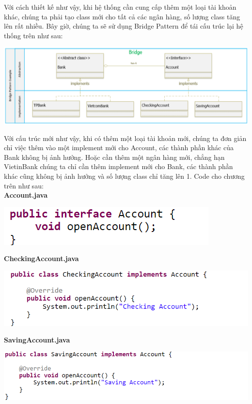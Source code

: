 Với cách thiết kế như vậy, khi hệ thống cần cung cấp thêm một loại tài khoản khác, chúng ta phải tạo class mới cho tất cả các ngân hàng, số lượng class tăng lên rất nhiều. Bây giờ, chúng ta sẽ sử dụng Bridge Pattern để tái cấu trúc lại hệ thống trên như sau:
\begin{center}
\includegraphics{GALLEYS/images/chapter8/examplepic2}
\end{center}
Với cấu trúc mới như vậy, khi có thêm một loại tài khoản mới, chúng ta đơn giản chỉ việc thêm vào một implement mới cho Account, các thành phần khác của Bank không bị ảnh hưởng. Hoặc cần thêm một ngân hàng mới, chẳng hạn VietinBank chúng ta chỉ cần thêm implement mới cho Bank, các thành phần khác cũng không bị ảnh hưởng và số lượng class chỉ tăng lên 1. Code cho chương trên như sau:\\
\newpage
\textbf{Account.java}
\begin{center}
\includegraphics{GALLEYS/images/chapter8/code1}
\end{center}
\textbf{CheckingAccount.java}
\begin{center}
\includegraphics{GALLEYS/images/chapter8/code2}
\end{center}
\textbf{SavingAccount.java}
\begin{center}
\includegraphics{GALLEYS/images/chapter8/code3}
\end{center}
